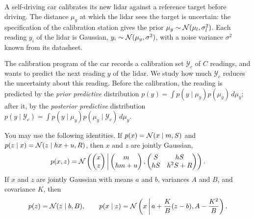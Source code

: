 \documentclass[11pt, a4paper]{exam}
\begin{document}
\begin{exercises}[1, 2][5]


A self-driving car calibrates its new lidar against a reference target before driving. The distance $\mu_y$ at which the lidar sees the target is uncertain: the specification of the calibration station gives the prior $\mu_y \sim \mathcal{N}(\mu_l, \sigma_l^2)$. Each reading $y_i$ of the lidar is Gaussian, $y_i \sim \mathcal{N}(\mu_y, \sigma^2)$, with a noise variance $\sigma^2$ known from its datasheet.

The calibration program of the car records a calibration set $\mathcal{Y}_c$ of $C$ readings, and wants to predict the next reading $y$ of the lidar. We study how much $\mathcal{Y}_c$ reduces the uncertainty about this reading. Before the calibration, the reading is predicted by the \emph{prior predictive} distribution $p(y) = \int p(y \mid \mu_y) p(\mu_y) \, d\mu_y$; after it, by the \emph{posterior predictive} distribution $p(y \mid \mathcal{Y}_c) = \int p(y \mid \mu_y) p(\mu_y \mid \mathcal{Y}_c) \, d\mu_y$.

You may use the following identities. If $p(x) = \mathcal{N}(x \mid m, S)$ and $p(z \mid x) = \mathcal{N}(z \mid h x + u, R)$, then $x$ and $z$ are jointly Gaussian,
\[
    p(x, z) = \mathcal{N}\left(\begin{pmatrix}x \\ z\end{pmatrix} \,\middle|\, \begin{pmatrix}m \\ h m + u\end{pmatrix}, \begin{pmatrix}S & h S \\ h S & h^2 S + R\end{pmatrix}\right).
\]
If $x$ and $z$ are jointly Gaussian with means $a$ and $b$, variances $A$ and $B$, and covariance $K$, then
\[
    p(z) = \mathcal{N}(z \mid b, B), \qquad p(x \mid z) = \mathcal{N}\left(x \,\middle|\, a + \frac{K}{B} (z - b), A - \frac{K^2}{B}\right).
\]


\end{exercises}
\end{document}
